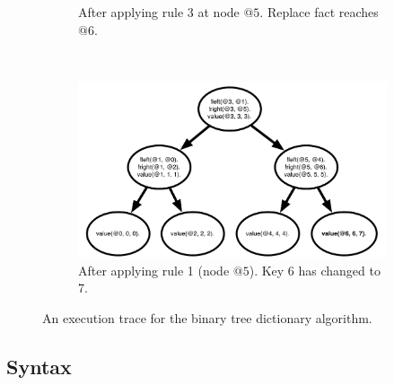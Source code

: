 \begin{figure}[]
\begin{subfigure}[b]{0.5\textwidth}
                \caption{After applying rule 3 at node $@5$. Replace fact reaches $@6$.}
                \label{fig:btree_trace3}
        \end{subfigure}%
        ~
        \begin{subfigure}[b]{0.5\textwidth}
                  \includegraphics[width=\textwidth]{btree_trace4}
                  \caption{After applying rule 1 (node $@5$). Key 6 has changed to 7.}
                  \label{fig:btree_trace4}
          \end{subfigure}
        \caption{An execution trace for the binary tree dictionary algorithm.}\label{fig:btree_trace}
\end{figure}

\subsection{Syntax}


